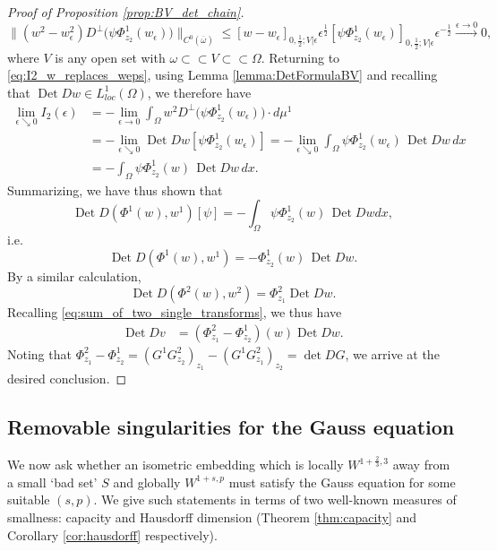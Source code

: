 \documentclass[12pt]{article}
\newcommand{\Det}{\operatorname{Det}}
\theoremstyle{plain}
\numberwithin{equation}{section}
\begin{document}
\begin{proof}[Proof of Proposition \ref{prop:BV_det_chain}]
    \begin{equation*}
        \|(w^2 - w^2_\epsilon)D^\perp \big(\psi \Phi^1_{z_2}(w_\epsilon)\big)\|_{C^0(\overline\omega)} \leq [w-w_\epsilon]_{0,\frac12;V|\epsilon} \epsilon^\frac12 [\psi \Phi^1_{z_2} (w_\epsilon)]_{0,\frac12;V|\epsilon} \epsilon^{-\frac12} \stackrel{\epsilon \rightarrow 0}{\longrightarrow} 0,
    \end{equation*}
    where $V$ is any open set with $\omega \subset\subset V \subset\subset \Omega$. Returning to \eqref{eq:I2_w_replaces_weps}, using Lemma \ref{lemma:DetFormulaBV} and recalling that $\Det Dw \in L^1_{loc}(\Omega)$, we therefore have
    \begin{align*}
        \lim_{\epsilon \searrow 0} I_2(\epsilon)
            & = - \lim_{\epsilon \rightarrow 0} \int_\Omega w^2 D^\perp\big(\psi \Phi^1_{z_2}(w_\epsilon)\big) \cdot d\mu^1\\
            &= - \lim_{\epsilon \searrow 0} \Det Dw [\psi \Phi^1_{z_2}(w_\epsilon)] 
                = - \lim_{\epsilon \searrow 0} \int_\Omega \psi \Phi^1_{z_2}(w_\epsilon)\, \Det Dw\,dx\\
            &= -\int_\Omega \psi \Phi^1_{z_2}(w)\,\Det Dw\, dx.
    \end{align*}
    Summarizing, we have thus shown that
    \begin{equation*}
        \Det D(\Phi^1(w),w^1)[\psi] =  -\int_\Omega \psi \Phi^1_{z_2}(w)\,\Det Dw dx,
    \end{equation*}
    i.e.
    \[
    \Det D(\Phi^1(w),w^1) = -\Phi^1_{z_2}(w)\,\Det Dw.
    \]
    By a similar calculation,
    \begin{equation*}
        \Det D(\Phi^2(w), w^2) = \Phi^2_{z_1} \Det Dw.
    \end{equation*}
    Recalling \eqref{eq:sum_of_two_single_transforms}, we thus have
    \begin{align*}
        \Det Dv &= (\Phi^2_{z_1}-\Phi^1_{z_2})(w) \Det Dw.
    \end{align*}
    Noting that $\Phi^2_{z_1} - \Phi^1_{z_2} = (G^1G^2_{z_2})_{z_1} - (G^1 G^2_{z_1})_{z_2} = \det DG$, we arrive at the desired conclusion.
\end{proof}

\subsection{Removable singularities for the Gauss equation} \label{sec:capacity}

We now ask whether an isometric embedding which is locally $W^{1+\frac23,3}$ away from a small `bad set' $S$ and globally $W^{1+s,p}$ must satisfy the Gauss equation for some suitable $(s,p)$. We give such statements in terms of two well-known measures of smallness: capacity and Hausdorff dimension (Theorem \ref{thm:capacity} and Corollary \ref{cor:hausdorff} respectively). 
\end{document}
